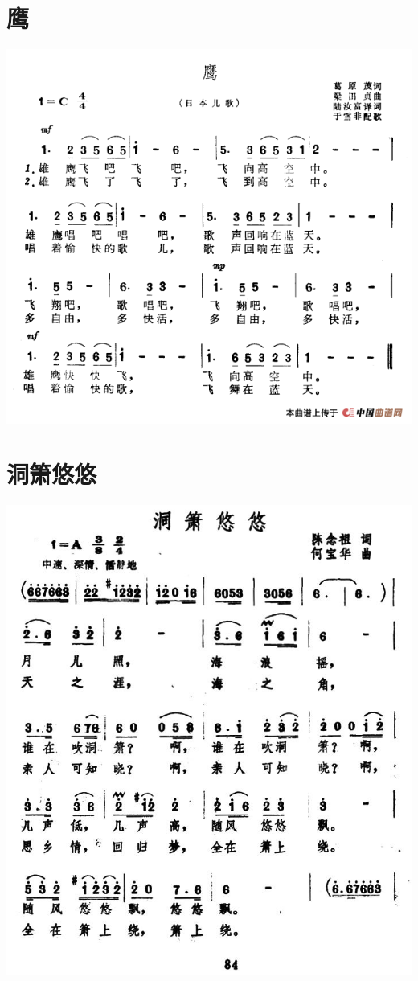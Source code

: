 \documentclass[cn,pad,chinese,chinesefont=nofont]{elegantbook}
\begin{document}
\section{鹰}
    \includegraphics[width=\textwidth]{dongxiao/日本-鹰.png}
\section{洞箫悠悠}
    \includegraphics[width=\textwidth]{dongxiao/洞箫悠悠.jpg}
\end{document}
